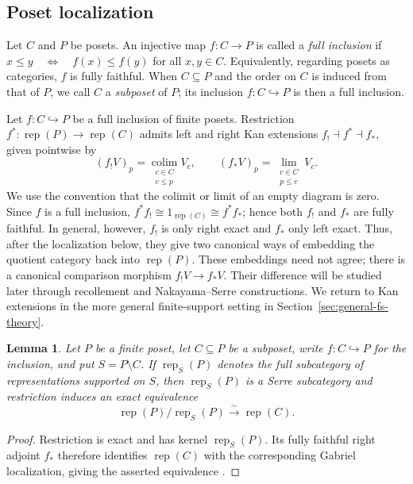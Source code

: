 \documentclass[12pt,reqno]{amsart}
\newtheorem{lemma}[theorem]{Lemma}
\theoremstyle{definition}
\theoremstyle{remark}
\newcommand{\Rep}{\operatorname{rep}}
\begin{document}
\subsection{Poset localization}

Let $C$ and $P$ be posets. An injective map $f:C\to P$ is called a
\emph{full inclusion} if $x\le y \quad\Longleftrightarrow\quad f(x)\le f(y)$
for all $x,y\in C$. Equivalently, regarding posets as categories, $f$
is fully faithful. When $C\subseteq P$ and the order on $C$ is induced
from that of $P$, we call $C$ a \emph{subposet} of $P$; its inclusion
$f:C\hookrightarrow P$ is then a full inclusion.


Let $f:C\hookrightarrow P$ be a full inclusion of finite posets.  Restriction
$f^*:\Rep(P)\to\Rep(C)$ admits left and right Kan extensions
$f_!\dashv f^*\dashv f_*$, given pointwise by
\[
(f_!V)_p=\operatorname*{colim}_{\substack{c\in C\\c\le p}}V_c,
\qquad
(f_*V)_p=\operatorname*{lim}_{\substack{c\in C\\p\le c}}V_c.
\]
We use the convention that the colimit or limit of an empty diagram is zero.
Since $f$ is a full inclusion, $f^*f_!\cong 1_{\Rep(C)}\cong f^*f_*$; hence
both $f_!$ and $f_*$ are fully faithful.  In general, however, $f_!$ is only
right exact and $f_*$ only left exact.  Thus, after the localization below,
they give two canonical ways of embedding the quotient category back into
$\Rep(P)$.  These embeddings need not agree; there is a canonical comparison
morphism $f_!V\to f_*V$.  Their difference will be studied later through
recollement and Nakayama--Serre constructions.  We return to Kan extensions in
the more general finite-support setting in Section~\ref{sec:general-fs-theory}.

\begin{lemma}\label{lem:poset-localization}
Let $P$ be a finite poset, let $C\subseteq P$ be a subposet, write
$f:C\hookrightarrow P$ for the inclusion, and put $S=P\setminus C$.  If
$\Rep_S(P)$ denotes the full subcategory of
representations supported on $S$, then $\Rep_S(P)$ is a Serre subcategory and
restriction induces an exact equivalence
\begin{equation}\label{eq:poset-localization}
\Rep(P)/\Rep_S(P)\xrightarrow{\sim}\Rep(C).
\end{equation}
\end{lemma}

\begin{proof}
Restriction is exact and has kernel $\Rep_S(P)$.  Its fully faithful right
adjoint $f_*$ therefore identifies $\Rep(C)$ with the corresponding Gabriel
localization, giving the asserted equivalence \cite{Gabriel}.
\end{proof}
\end{document}
